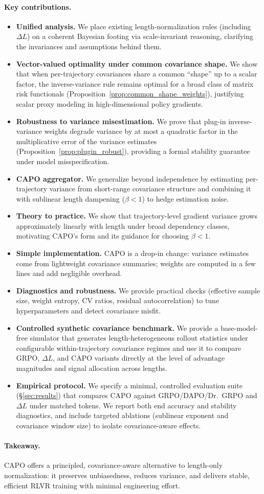 \paragraph{Key contributions.}
\begin{itemize}
  \item \textbf{Unified analysis.} We place existing length-normalization rules (including $\Delta L$) on a coherent Bayesian footing via scale-invariant reasoning, clarifying the invariances and assumptions behind them.
  
  \item \textbf{Vector-valued optimality under common covariance shape.} We show that when per-trajectory covariances share a common ``shape'' up to a scalar factor, the inverse-variance rule remains optimal for a broad class of matrix risk functionals (Proposition~\ref{prop:common_shape_weights}), justifying scalar proxy modeling in high-dimensional policy gradients.
  \item \textbf{Robustness to variance misestimation.} We prove that plug-in inverse-variance weights degrade variance by at most a quadratic factor in the multiplicative error of the variance estimates (Proposition~\ref{prop:plugin_robust}), providing a formal stability guarantee under model misspecification.
  \item \textbf{CAPO aggregator.} We generalize beyond independence by estimating per-trajectory variance from short-range covariance structure and combining it with sublinear length dampening (\(\beta<1\)) to hedge estimation noise.
  \item \textbf{Theory to practice.} We show that trajectory-level gradient variance grows approximately linearly with length under broad dependency classes, motivating CAPO’s form and its guidance for choosing $\beta<1$.
  \item \textbf{Simple implementation.} CAPO is a drop-in change: variance estimates come from lightweight covariance summaries; weights are computed in a few lines and add negligible overhead.
  \item \textbf{Diagnostics and robustness.} We provide practical checks (effective sample size, weight entropy, CV ratios, residual autocorrelation) to tune hyperparameters and detect covariance misfit.
  \item \textbf{Controlled synthetic covariance benchmark.} We provide a base-model-free simulator that generates length-heterogeneous rollout statistics under configurable within-trajectory covariance regimes and use it to compare GRPO, $\Delta L$, and CAPO variants directly at the level of advantage magnitudes and signal allocation across lengths.
  \item \textbf{Empirical protocol.} We specify a minimal, controlled evaluation suite (\S\ref{sec:results}) that compares CAPO against GRPO/DAPO/Dr.~GRPO and $\Delta L$ under matched tokens. We report both end accuracy and stability diagnostics, and include targeted ablations (sublinear exponent and covariance window size) to isolate covariance-aware effects.
\end{itemize}

\paragraph{Takeaway.}
CAPO offers a principled, covariance-aware alternative to length-only normalization: it preserves unbiasedness, reduces variance, and delivers stable, efficient RLVR training with minimal engineering effort.
